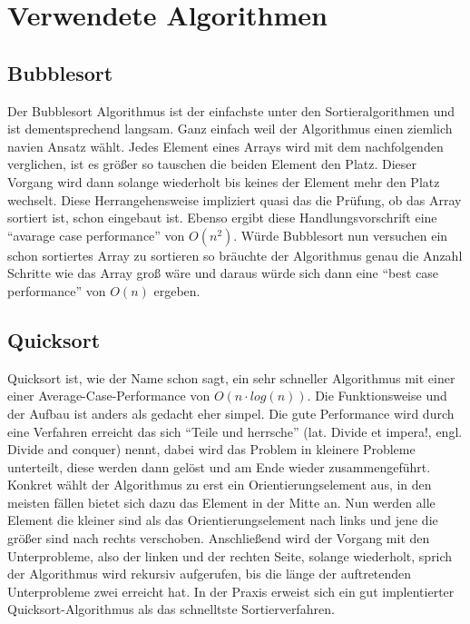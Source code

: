 \section{Verwendete Algorithmen}
\subsection{Bubblesort}
 Der Bubblesort Algorithmus ist der einfachste unter den Sortieralgorithmen und ist dementsprechend langsam.
 Ganz einfach weil der Algorithmus einen ziemlich navien Ansatz wählt. Jedes Element eines Arrays wird mit dem nachfolgenden verglichen, ist es größer 
 so tauschen die beiden Element den Platz. Dieser Vorgang wird dann solange wiederholt bis keines der Element mehr den Platz wechselt. 
 Diese Herrangehensweise impliziert quasi das die Prüfung, ob das Array sortiert ist, schon eingebaut ist. 
 Ebenso ergibt diese Handlungsvorschrift eine "`avarage case performance"' von
 $O(n^2)$. Würde Bubblesort nun versuchen ein schon sortiertes Array zu sortieren so bräuchte der Algorithmus genau die 
 Anzahl Schritte wie das Array groß wäre und daraus würde sich dann eine "`best case performance"' von $O(n)$ ergeben.
 \parencite[vgl.][]{Bubblesort}
 
\subsection{Quicksort}
Quicksort ist, wie der Name schon sagt, ein sehr schneller Algorithmus mit einer einer Average-Case-Performance von $O(n\cdot log(n))$. 
Die Funktionsweise und der Aufbau ist anders als gedacht eher simpel. Die gute Performance wird durch eine Verfahren erreicht das 
sich "`Teile und herrsche"' (lat. Divide et impera!, engl. Divide and conquer)\cite{wiki_quicksort} nennt, dabei wird das Problem
in kleinere Probleme unterteilt, diese werden dann gelöst und am Ende wieder zusammengeführt. Konkret wählt der Algorithmus
zu erst ein Orientierungselement aus, in den meisten fällen bietet sich dazu das Element in der Mitte an. Nun werden alle Element die kleiner
sind als das Orientierungselement nach links und jene
die größer sind nach rechts verschoben. Anschließend wird der Vorgang mit den Unterprobleme, also der linken und der 
rechten Seite, solange wiederholt, sprich der
Algorithmus wird rekursiv aufgerufen, bis die länge der auftretenden Unterprobleme zwei erreicht hat. In der Praxis
erweist sich ein gut implentierter Quicksort-Algorithmus als das schnelltste Sortierverfahren. \parencite[vgl.][]{quicksort}

